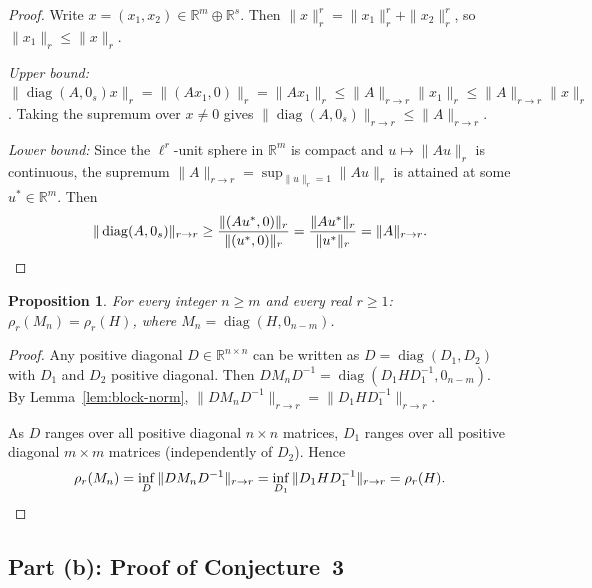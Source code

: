 \documentclass{article}
\newtheorem{proposition}[theorem]{Proposition}
\begin{document}
\begin{proof}
Write $x = (x_1, x_2) \in \mathbb{R}^m \oplus \mathbb{R}^s$. Then $\|x\|_r^r = \|x_1\|_r^r + \|x_2\|_r^r$, so $\|x_1\|_r \leq \|x\|_r$.

\textit{Upper bound:} $\|\operatorname{diag}(A,0_s)x\|_r = \|(Ax_1, 0)\|_r = \|Ax_1\|_r \leq \|A\|_{r\to r}\|x_1\|_r \leq \|A\|_{r\to r}\|x\|_r$. Taking the supremum over $x \neq 0$ gives $\|\operatorname{diag}(A,0_s)\|_{r\to r} \leq \|A\|_{r\to r}$.

\textit{Lower bound:} Since the $\ell^r$-unit sphere in $\mathbb{R}^m$ is compact and $u \mapsto \|Au\|_r$ is continuous, the supremum $\|A\|_{r\to r} = \sup_{\|u\|_r=1}\|Au\|_r$ is attained at some $u^* \in \mathbb{R}^m$. Then
\[
\|\operatorname{diag}(A,0_s)\|_{r\to r} \geq \frac{\|(Au^*, 0)\|_r}{\|(u^*, 0)\|_r} = \frac{\|Au^*\|_r}{\|u^*\|_r} = \|A\|_{r\to r}. \qedhere
\]
\end{proof}

\begin{proposition}
For every integer $n \geq m$ and every real $r \geq 1$: $\rho_r(M_n) = \rho_r(H)$, where $M_n = \operatorname{diag}(H, 0_{n-m})$.
\end{proposition}

\begin{proof}
Any positive diagonal $D \in \mathbb{R}^{n\times n}$ can be written as $D = \operatorname{diag}(D_1, D_2)$ with $D_1$ and $D_2$ positive diagonal. Then $DM_nD^{-1} = \operatorname{diag}(D_1HD_1^{-1}, 0_{n-m})$. By Lemma~\ref{lem:block-norm}, $\|DM_nD^{-1}\|_{r\to r} = \|D_1HD_1^{-1}\|_{r\to r}$.

As $D$ ranges over all positive diagonal $n\times n$ matrices, $D_1$ ranges over all positive diagonal $m\times m$ matrices (independently of $D_2$). Hence
\[
\rho_r(M_n) = \inf_D \|DM_nD^{-1}\|_{r\to r} = \inf_{D_1} \|D_1HD_1^{-1}\|_{r\to r} = \rho_r(H). \qedhere
\]
\end{proof}

\subsection*{Part (b): Proof of Conjecture~3}
\end{document}
